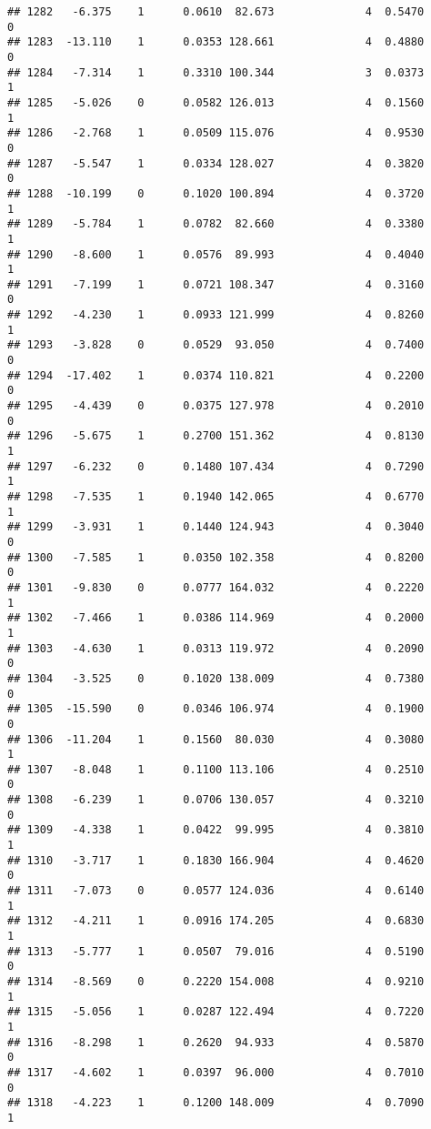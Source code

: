 \documentclass[
]{article}
\begin{document}
\begin{verbatim}
## 1282   -6.375    1      0.0610  82.673              4  0.5470      0
## 1283  -13.110    1      0.0353 128.661              4  0.4880      0
## 1284   -7.314    1      0.3310 100.344              3  0.0373      1
## 1285   -5.026    0      0.0582 126.013              4  0.1560      1
## 1286   -2.768    1      0.0509 115.076              4  0.9530      0
## 1287   -5.547    1      0.0334 128.027              4  0.3820      0
## 1288  -10.199    0      0.1020 100.894              4  0.3720      1
## 1289   -5.784    1      0.0782  82.660              4  0.3380      1
## 1290   -8.600    1      0.0576  89.993              4  0.4040      1
## 1291   -7.199    1      0.0721 108.347              4  0.3160      0
## 1292   -4.230    1      0.0933 121.999              4  0.8260      1
## 1293   -3.828    0      0.0529  93.050              4  0.7400      0
## 1294  -17.402    1      0.0374 110.821              4  0.2200      0
## 1295   -4.439    0      0.0375 127.978              4  0.2010      0
## 1296   -5.675    1      0.2700 151.362              4  0.8130      1
## 1297   -6.232    0      0.1480 107.434              4  0.7290      1
## 1298   -7.535    1      0.1940 142.065              4  0.6770      1
## 1299   -3.931    1      0.1440 124.943              4  0.3040      0
## 1300   -7.585    1      0.0350 102.358              4  0.8200      0
## 1301   -9.830    0      0.0777 164.032              4  0.2220      1
## 1302   -7.466    1      0.0386 114.969              4  0.2000      1
## 1303   -4.630    1      0.0313 119.972              4  0.2090      0
## 1304   -3.525    0      0.1020 138.009              4  0.7380      0
## 1305  -15.590    0      0.0346 106.974              4  0.1900      0
## 1306  -11.204    1      0.1560  80.030              4  0.3080      1
## 1307   -8.048    1      0.1100 113.106              4  0.2510      0
## 1308   -6.239    1      0.0706 130.057              4  0.3210      0
## 1309   -4.338    1      0.0422  99.995              4  0.3810      1
## 1310   -3.717    1      0.1830 166.904              4  0.4620      0
## 1311   -7.073    0      0.0577 124.036              4  0.6140      1
## 1312   -4.211    1      0.0916 174.205              4  0.6830      1
## 1313   -5.777    1      0.0507  79.016              4  0.5190      0
## 1314   -8.569    0      0.2220 154.008              4  0.9210      1
## 1315   -5.056    1      0.0287 122.494              4  0.7220      1
## 1316   -8.298    1      0.2620  94.933              4  0.5870      0
## 1317   -4.602    1      0.0397  96.000              4  0.7010      0
## 1318   -4.223    1      0.1200 148.009              4  0.7090      1

\end{verbatim}
\end{document}
